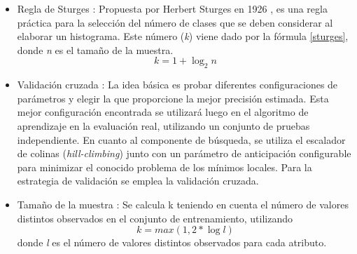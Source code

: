 \begin{itemize}
	
	\item Regla de Sturges \citep{coria2013mineria}: Propuesta por Herbert Sturges en 1926 \citep{sturges1926choice}, es una regla práctica para la selección del número de clases que se deben considerar al elaborar un histograma. Este número (\textit{k}) viene dado por la fórmula \ref{sturges}, donde \textit{n} es el tamaño de la muestra.
	\begin{equation} \label{sturges}
		k = 1 + \log_{2} n
	\end{equation}
	
	\item Validación cruzada \citep{torgo1997search}: La idea básica es probar diferentes configuraciones de parámetros y elegir la que proporcione la mejor precisión estimada. Esta mejor configuración encontrada se utilizará luego en el algoritmo de aprendizaje en la evaluación real, utilizando un conjunto de pruebas independiente. En cuanto al componente de búsqueda, se utiliza el escalador de colinas (\textit{hill-climbing}) junto con un parámetro de anticipación configurable para minimizar el conocido problema de los mínimos locales. Para la estrategia de validación se emplea la validación cruzada.
	
	\item Tamaño de la muestra \citep{dougherty1995supervised}: Se calcula k teniendo en cuenta el número de valores distintos observados en el conjunto de entrenamiento, utilizando
	\begin{equation}
		k = max(1, 2 * \log l )
	\end{equation}
	donde \textit{l} es el número de valores distintos observados para cada atributo.
	
\end{itemize}

